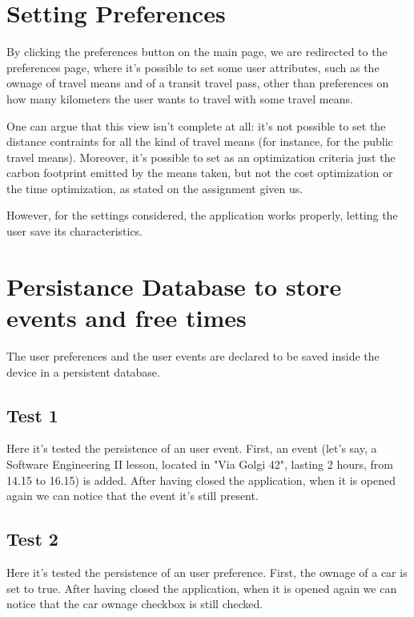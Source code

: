 \section{Setting Preferences}
By clicking the preferences button on the main page, we are redirected to the preferences page, where it's possible to set some user attributes, such as the ownage of travel means and of a transit travel pass, other than preferences on how many kilometers the user wants to travel with some travel means.

One can argue that this view isn't complete at all: it's not possible to set the distance contraints for all the kind of travel means (for instance, for the public travel means).
Moreover, it's possible to set as an optimization criteria just the carbon footprint emitted by the means taken, but not the cost optimization or the time optimization, as stated on the assignment given us.


However, for the settings considered, the application works properly, letting the user save its characteristics.

\section{Persistance Database to store events and free times}
The user preferences and the user events are declared to be saved inside the device in a persistent database.

\subsection{Test 1}
Here it's tested the persistence of an user event.
First, an event (let's say, a Software Engineering II lesson, located in "Via Golgi 42", lasting 2 hours, from 14.15 to 16.15) is added. After having closed the application, when it is opened again we can notice that the event it's still present.


\subsection{Test 2}
Here it's tested the persistence of an user preference.
First, the ownage of a car is set to true. After having closed the application, when it is opened again we can notice that the car ownage checkbox is still checked.

